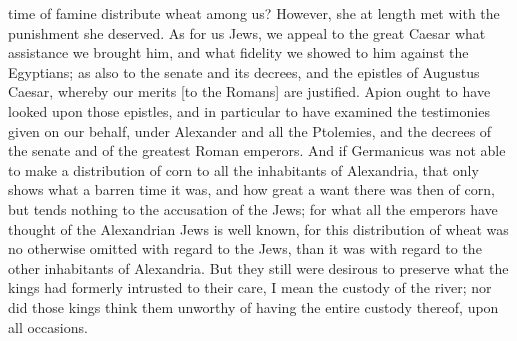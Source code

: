 time of famine distribute wheat among us? However, she at length met with
the punishment she deserved. As for us Jews, we appeal to the great Caesar
what assistance we brought him, and what fidelity we showed to him against
the Egyptians; as also to the senate and its decrees, and the epistles of
Augustus Caesar, whereby our merits [to the Romans] are justified. Apion
ought to have looked upon those epistles, and in particular to have
examined the testimonies given on our behalf, under Alexander and all the
Ptolemies, and the decrees of the senate and of the greatest Roman
emperors. And if Germanicus was not able to make a distribution of corn to
all the inhabitants of Alexandria, that only shows what a barren time it
was, and how great a want there was then of corn, but tends nothing to the
accusation of the Jews; for what all the emperors have thought of the
Alexandrian Jews is well known, for this distribution of wheat was no
otherwise omitted with regard to the Jews, than it was with regard to the
other inhabitants of Alexandria. But they still were desirous to preserve
what the kings had formerly intrusted to their care, I mean the custody of
the river; nor did those kings think them unworthy of having the entire
custody thereof, upon all occasions.


